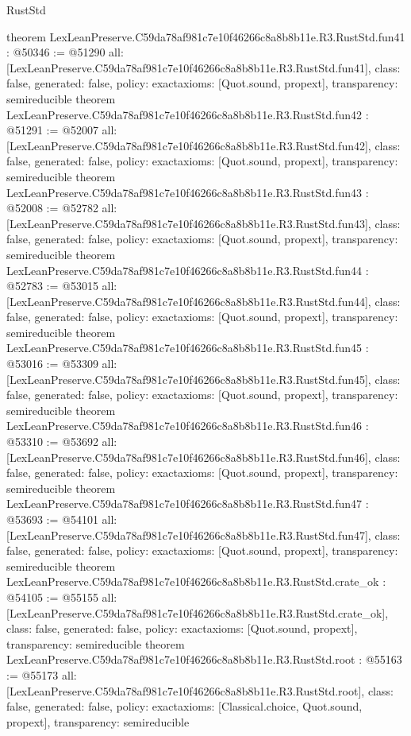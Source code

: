 \begin{lexlean}{RustStd}
\begin{coremodule}
{}
theorem LexLeanPreserve.C59da78af981c7e10f46266c8a8b8b11e.R3.RustStd.fun41 : @50346 := @51290 {
  all: [LexLeanPreserve.C59da78af981c7e10f46266c8a8b8b11e.R3.RustStd.fun41],
  class: false,
  generated: false,
  policy: exact{axioms: [Quot.sound, propext]},
  transparency: semireducible
}
theorem LexLeanPreserve.C59da78af981c7e10f46266c8a8b8b11e.R3.RustStd.fun42 : @51291 := @52007 {
  all: [LexLeanPreserve.C59da78af981c7e10f46266c8a8b8b11e.R3.RustStd.fun42],
  class: false,
  generated: false,
  policy: exact{axioms: [Quot.sound, propext]},
  transparency: semireducible
}
theorem LexLeanPreserve.C59da78af981c7e10f46266c8a8b8b11e.R3.RustStd.fun43 : @52008 := @52782 {
  all: [LexLeanPreserve.C59da78af981c7e10f46266c8a8b8b11e.R3.RustStd.fun43],
  class: false,
  generated: false,
  policy: exact{axioms: [Quot.sound, propext]},
  transparency: semireducible
}
theorem LexLeanPreserve.C59da78af981c7e10f46266c8a8b8b11e.R3.RustStd.fun44 : @52783 := @53015 {
  all: [LexLeanPreserve.C59da78af981c7e10f46266c8a8b8b11e.R3.RustStd.fun44],
  class: false,
  generated: false,
  policy: exact{axioms: [Quot.sound, propext]},
  transparency: semireducible
}
theorem LexLeanPreserve.C59da78af981c7e10f46266c8a8b8b11e.R3.RustStd.fun45 : @53016 := @53309 {
  all: [LexLeanPreserve.C59da78af981c7e10f46266c8a8b8b11e.R3.RustStd.fun45],
  class: false,
  generated: false,
  policy: exact{axioms: [Quot.sound, propext]},
  transparency: semireducible
}
theorem LexLeanPreserve.C59da78af981c7e10f46266c8a8b8b11e.R3.RustStd.fun46 : @53310 := @53692 {
  all: [LexLeanPreserve.C59da78af981c7e10f46266c8a8b8b11e.R3.RustStd.fun46],
  class: false,
  generated: false,
  policy: exact{axioms: [Quot.sound, propext]},
  transparency: semireducible
}
theorem LexLeanPreserve.C59da78af981c7e10f46266c8a8b8b11e.R3.RustStd.fun47 : @53693 := @54101 {
  all: [LexLeanPreserve.C59da78af981c7e10f46266c8a8b8b11e.R3.RustStd.fun47],
  class: false,
  generated: false,
  policy: exact{axioms: [Quot.sound, propext]},
  transparency: semireducible
}
theorem LexLeanPreserve.C59da78af981c7e10f46266c8a8b8b11e.R3.RustStd.crate_ok : @54105 := @55155 {
  all: [LexLeanPreserve.C59da78af981c7e10f46266c8a8b8b11e.R3.RustStd.crate_ok],
  class: false,
  generated: false,
  policy: exact{axioms: [Quot.sound, propext]},
  transparency: semireducible
}
theorem LexLeanPreserve.C59da78af981c7e10f46266c8a8b8b11e.R3.RustStd.root : @55163 := @55173 {
  all: [LexLeanPreserve.C59da78af981c7e10f46266c8a8b8b11e.R3.RustStd.root],
  class: false,
  generated: false,
  policy: exact{axioms: [Classical.choice, Quot.sound, propext]},
  transparency: semireducible
}


\end{coremodule}
\end{lexlean}
